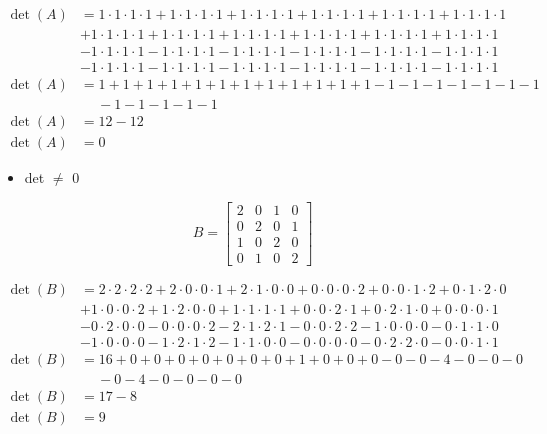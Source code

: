 \documentclass[12pt]{article}
\begin{document}
\[
\begin{aligned}
\operatorname{det}(A) & = 1 \cdot 1 \cdot 1 \cdot 1 + 1 \cdot 1 \cdot 1 \cdot 1 + 1 \cdot 1 \cdot 1 \cdot 1 + 1 \cdot 1 \cdot 1 \cdot 1 + 1 \cdot 1 \cdot 1 \cdot 1 + 1 \cdot 1 \cdot 1 \cdot 1\\
& + 1 \cdot 1 \cdot 1 \cdot 1 + 1 \cdot 1 \cdot 1 \cdot 1 + 1 \cdot 1 \cdot 1 \cdot 1 + 1 \cdot 1 \cdot 1 \cdot 1 + 1 \cdot 1 \cdot 1 \cdot 1 + 1 \cdot 1 \cdot 1 \cdot 1\\
& - 1 \cdot 1 \cdot 1 \cdot 1 - 1 \cdot 1 \cdot 1 \cdot 1 - 1 \cdot 1 \cdot 1 \cdot 1 - 1 \cdot 1 \cdot 1 \cdot 1 - 1 \cdot 1 \cdot 1 \cdot 1 - 1 \cdot 1 \cdot 1 \cdot 1\\
& - 1 \cdot 1 \cdot 1 \cdot 1 - 1 \cdot 1 \cdot 1 \cdot 1 - 1 \cdot 1 \cdot 1 \cdot 1 - 1 \cdot 1 \cdot 1 \cdot 1 - 1 \cdot 1 \cdot 1 \cdot 1 - 1 \cdot 1 \cdot 1 \cdot 1 \\ 
\operatorname{det}(A) & = 1 + 1 + 1 + 1 + 1 + 1 + 1 + 1 + 1 + 1 + 1 + 1 - 1 - 1 - 1 - 1 - 1 - 1 - 1 \\ & \quad \ - 1 - 1 - 1 - 1 - 1 \\
\operatorname{det}(A) & = 12-12 \\
\operatorname{det}(A) & = 0
\end{aligned}
\]

\begin{itemize}
    \item det $\neq$ 0
\end{itemize}
\[
  B =
  \left[ {\begin{array}{cccc}
    2 & 0 & 1 & 0\\
    0 & 2 & 0 & 1\\
    1 & 0 & 2 & 0\\
    0 & 1 & 0 & 2
  \end{array} } \right]
\]

\[
\begin{aligned}
\operatorname{det}(B) & = 2 \cdot 2 \cdot 2 \cdot 2 + 2 \cdot 0 \cdot 0 \cdot 1 + 2 \cdot 1 \cdot 0 \cdot 0 + 0 \cdot 0 \cdot 0 \cdot 2 + 0 \cdot 0 \cdot 1 \cdot 2 + 0 \cdot 1 \cdot 2 \cdot 0 \\
&  + 1 \cdot 0 \cdot 0 \cdot 2 + 1 \cdot 2 \cdot 0 \cdot 0 + 1 \cdot 1 \cdot 1 \cdot 1 + 0 \cdot 0 \cdot 2 \cdot 1 + 0 \cdot 2 \cdot 1 \cdot 0 + 0 \cdot 0 \cdot 0 \cdot 1 \\
& - 0 \cdot 2 \cdot 0 \cdot 0 - 0 \cdot 0 \cdot 0 \cdot 2 - 2 \cdot 1 \cdot 2 \cdot 1 - 0 \cdot 0 \cdot 2 \cdot 2 - 1 \cdot 0 \cdot 0 \cdot 0 - 0 \cdot 1 \cdot 1 \cdot 0 \\
& - 1 \cdot 0 \cdot 0 \cdot 0 - 1 \cdot 2 \cdot 1 \cdot 2 - 1 \cdot 1 \cdot 0 \cdot 0 - 0 \cdot 0 \cdot 0 \cdot 0 - 0 \cdot 2 \cdot 2 \cdot 0 - 0 \cdot 0 \cdot 1 \cdot 1\\ 
\operatorname{det}(B) & = 16 + 0 + 0 + 0 + 0 + 0 + 0 + 0 + 1 + 0 + 0 + 0 - 0 - 0 - 4 - 0 - 0 - 0 \\ & \quad \ - 0 - 4 - 0 - 0 - 0 - 0 \\
\operatorname{det}(B) & = 17-8 \\
\operatorname{det}(B) & = 9
\end{aligned}
\]
\end{document}
